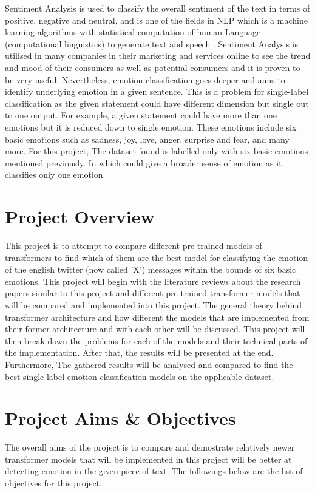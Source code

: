 Sentiment Analysis is used to classify the overall sentiment of the text in terms of positive, negative and neutral, 
and is one of the fields in NLP which is a machine learning algorithms with statistical computation of human Language (computational linguistics)
to generate text and speech \cite{nlp}. 
Sentiment Analysis is utilised in many companies in their marketing and services online to see the trend and mood of their consumers as well as potential consumers
and it is proven to be very useful.
Nevertheless, emotion classification goes deeper and aims to identify underlying emotion in a given sentence.
This is a problem for single-label classification as the given statement could have different dimension but single out to one output.
For example, a given statement could have more than one emotions but it is reduced down to single emotion.
These emotions include six basic emotions such as sadness, joy, love, anger, surprise and fear, and many more.
For this project, The dataset \cite{saravia-etal-2018-carer} found is labelled only with six basic emotions mentioned previously.
In which could give a broader sense of emotion as it classifies only one emotion.

\section{Project Overview}

This project is to attempt to compare different pre-trained models of transformers to find which of them are the best model for classifying the emotion of the english twitter (now called 'X') messages within the bounds of six basic emotions.
This project will begin with the literature reviews about the research papers similar to this project and different pre-trained transformer models that will be compared and implemented into this project. 
The general theory behind transformer architecture and how different the models that are implemented from their former architecture and with each other will be discussed.
This project will then break down the problems for each of the models and their technical parts of the implementation. 
After that, the results will be presented at the end. Furthermore, The gathered results will be analysed and compared to find the best single-label emotion classification models on the applicable dataset.

\section{Project Aims \& Objectives}
The overall aims of the project is to compare and demostrate relatively newer transformer models that will be implemented in this project
will be better at detecting emotion in the given piece of text. The followings below are the list of objectives for this project:

